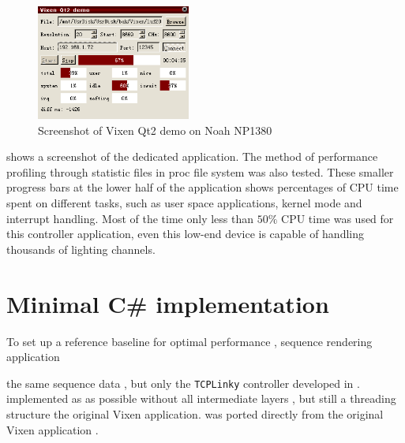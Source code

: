 \begin{figure}[t]
  \centering
  \includegraphics[width=0.45\textwidth]{Figs/vixen_noah.png}%
  \caption{\footnotesize Screenshot of Vixen Qt2 demo on Noah NP1380}
  \label{fig:vixen_noah}
\end{figure}

 shows a screenshot of the dedicated application. The method of performance profiling through statistic files in proc file system was also tested. These smaller progress bars at the lower half of the application shows percentages of CPU time spent on different tasks, such as user space applications, kernel mode and interrupt handling. Most of the time only less than $50 \%$ CPU time was used for this controller application,  even this low-end device is capable of handling thousands of lighting channels.

\section{Minimal C\# implementation}

To set up a reference baseline for optimal performance , sequence rendering application 


 the same  sequence data , but  only the \texttt{TCPLinky} controller developed in .  implemented as  as possible without all intermediate layers , but still  a threading structure  the original Vixen application.  was ported directly from the original Vixen application .

